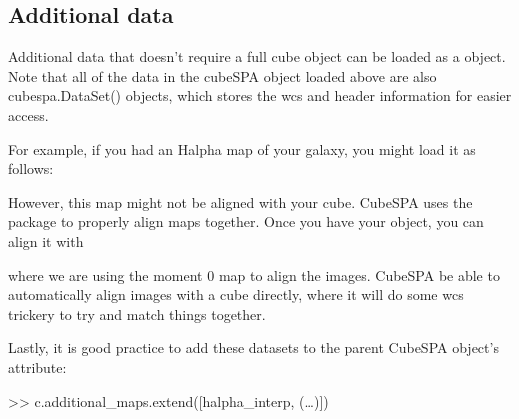 \documentclass[letterpaper,10pt,english]{sphinxmanual}
\begin{document}
\subsection{Additional data}
\label{\detokenize{getting_started:additional-data}}
\sphinxAtStartPar
Additional data that doesn’t require a full cube object can be loaded as a  object.
Note that all of the data in the cubeSPA object loaded above are also cubespa.DataSet() objects, which stores
the wcs and header information for easier access.

\sphinxAtStartPar
For example, if you had an H\sphinxhyphen{}alpha map of your galaxy, you might load it as follows:

\begin{sphinxVerbatim}[commandchars=\\\{\}]
   
\end{sphinxVerbatim}

\sphinxAtStartPar
However, this map might not be aligned with your cube. CubeSPA uses the
package to properly align maps together. Once you have your  object, you can align it with

\begin{sphinxVerbatim}[commandchars=\\\{\}]
   
\end{sphinxVerbatim}

\sphinxAtStartPar
where we are using the moment 0 map to align the images. CubeSPA  be able to automatically
align images with a cube directly, where it will do some wcs  trickery to try and match things
together.

\sphinxAtStartPar
Lastly, it is good practice to add these datasets to the parent CubeSPA object’s  attribute:

\sphinxAtStartPar
\textgreater{}\textgreater{} c.additional\_maps.extend({[}halpha\_interp, (…){]})
\end{document}
